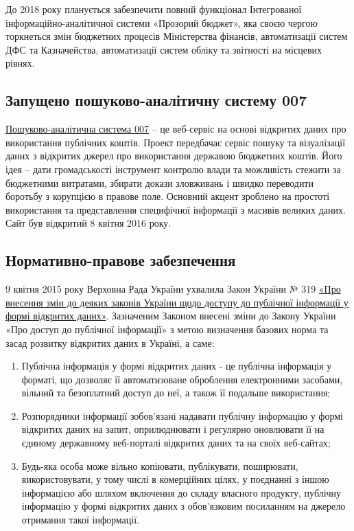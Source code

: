До 2018 року планується забезпечити повний функціонал Інтегрованої інформаційно-аналітичної системи «Прозорий бюджет», яка своєю чергою торкнеться змін бюджетних процесів Міністерства фінансів, автоматизації систем ДФС та Казначейства, автоматизації систем обліку та звітності на місцевих рівнях.

\subsection{Запущено пошуково-аналітичну систему 007}

\href{https://www.facebook.com/pointOOSeven}{Пошуково-аналітична система 007} – це веб-сервіс на основі відкритих даних про використання публічних коштів. Проект передбачає сервіс пошуку та візуалізації даних з відкритих джерел про використання державою бюджетних коштів. Його ідея – дати громадськості інструмент контролю влади та можливість стежити за бюджетними витратами, збирати докази зловживань і швидко переводити боротьбу з корупцією в правове поле. Основний акцент зроблено на простоті використання та представлення специфічної інформації з масивів великих даних. Сайт був відкритий 8 квітня 2016 року.

\subsection{Нормативно-правове забезпечення}

9 квітня 2015 року Верховна Рада України ухвалила Закон України № 319 \href{http://zakon3.rada.gov.ua/laws/show/319-19}{«Про внесення змін до деяких законів України щодо доступу до публічної інформації у формі відкритих даних»}. Зазначеним Законом внесені зміни до Закону України «Про доступ до публічної інформації» з метою визначення базових норма та засад розвитку відкритих даних в Україні, а саме:

\begin{enumerate}
    \item Публічна інформація у формі відкритих даних - це публічна інформація у форматі, що дозволяє її автоматизоване оброблення електронними засобами, вільний та безоплатний доступ до неї, а також її подальше використання;
    \item Розпорядники інформації зобов'язані надавати публічну інформацію у формі відкритих даних на запит, оприлюднювати і регулярно оновлювати її на єдиному державному веб-порталі відкритих даних та на своїх веб-сайтах;
    \item Будь-яка особа може вільно копіювати, публікувати, поширювати, використовувати, у тому числі в комерційних цілях, у поєднанні з іншою інформацією або шляхом включення до складу власного продукту, публічну інформацію у формі відкритих даних з обов'язковим посиланням на джерело отримання такої інформації.
\end{enumerate}

